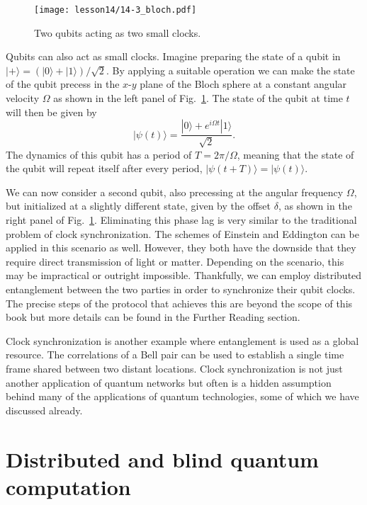 \begin{figure}[t]
    \centering
    \texttt{[image: lesson14/14-3\_bloch.pdf]}
    \caption[Qubit clocks.]{Two qubits acting as two small clocks.}
    \label{fig:14-3_bloch}
\end{figure}

Qubits can also act as small clocks.
Imagine preparing the state of a qubit in $|+\rangle = (|0\rangle + |1\rangle) / \sqrt{2}$.
By applying a suitable operation we can make the state of the qubit precess in the $x$-$y$ plane of the Bloch sphere at a constant angular velocity $\Omega$ as shown in the left panel of Fig.~\ref{fig:14-3_bloch}.
The state of the qubit at time $t$ will then be given by
\begin{equation}
    |\psi(t)\rangle = \frac{|0\rangle + e^{i\Omega t} |1\rangle}{\sqrt{2}}.
\end{equation}
The dynamics of this qubit has a period of $T = 2\pi / \Omega$, meaning that the state of the qubit will repeat itself after every period, $|\psi(t+T)\rangle = |\psi(t)\rangle$.

We can now consider a second qubit, also precessing at the angular frequency $\Omega$, but initialized at a slightly different state, given by the offset $\delta$, as shown in the right panel of Fig.~\ref{fig:14-3_bloch}.
Eliminating this phase lag is very similar to the traditional problem of clock synchronization.
The schemes of Einstein and Eddington can be applied in this scenario as well.
However, they both have the downside that they require direct transmission of light or matter.
Depending on the scenario, this may be impractical or outright impossible.
Thankfully, we can employ distributed entanglement between the two parties in order to synchronize their qubit clocks.
The precise steps of the protocol that achieves this are beyond the scope of this book but more details can be found in the Further Reading section.

Clock synchronization is another example where entanglement is used as a global resource.
The correlations of a Bell pair can be used to establish a single time frame shared between two distant locations.
Clock synchronization is not just another application of quantum networks but often is a hidden assumption behind many of the applications of quantum technologies, some of which we have discussed already.






\section{Distributed and blind quantum computation}
\label{sec:14-4_distributed_bqc}

